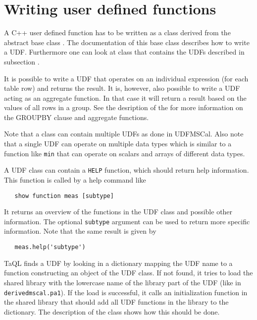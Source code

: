 \section{\label{TAQL:UDFWRITE}Writing user defined functions}
A C++ user defined function has to be written as a class
derived from the abstract base class
.
The documentation of this base class describes how to write a
UDF. Furthermore one can look at class
that contains the UDFs described in subsection
.

It is possible to write a UDF that operates on an individual
expression (for each table row) and returns the result.
It is, however, also possible to
write a UDF acting as an aggregate function. In that case it will
return a result based on the values of all rows in a group.
See the desription of the  for
more information on the GROUPBY clause and aggregate functions.

Note that a class can contain multiple UDFs as done in UDFMSCal.
Also note that a single UDF can operate on multiple data types which
is similar to a function like \texttt{min} that can operate on scalars
and arrays of different data types.

A UDF class can contain a  {\tt HELP} function, which should return
help information. This function is called by a help command like
\begin{verbatim}
   show function meas [subtype]
\end{verbatim}
It returns an overview of the functions in the UDF class and
possible other information. The optional {\tt subtype} argument can be
used to return more specific information.
Note that the same result is given by
\begin{verbatim}
   meas.help('subtype')
\end{verbatim}

TaQL finds a UDF by looking in a dictionary mapping the UDF name
to a function constructing an object of the UDF class. If not found,
it tries to load the shared library with the lowercase name of the library part
of the UDF (like in \texttt{derivedmscal.pa1}). If the load is successful, it calls an
initialization function in the shared library that should add all UDF
functions in the library to the dictionary. The description of the
class shows how this should be done.

